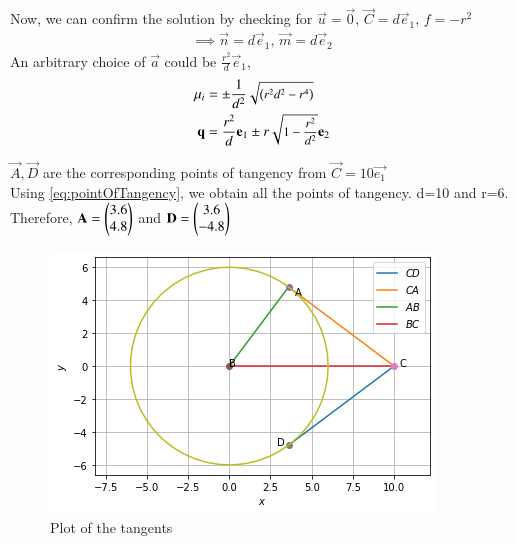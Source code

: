 \documentclass[journal,12pt,twocolumn]{IEEEtran}
\begin{document}
Now, we can confirm the solution by checking for $\vec{u}=\vec{0},\, \vec{C}=d\vec{e}_1,\, f=-r^2$
\begin{align}
  \implies \vec{n}=d\vec{e}_1,\, \vec{m}=d\vec{e}_2
\end{align}
An arbitrary choice of $\vec{a}$ could be $\frac{r^2}{d}\vec{e}_1$,
\begin{align}
  \mu_i &= \pm\frac{1}
  {
  d^2
  }
  {\small
  \sqrt{
  \left(r^2d^2-r^4\right)
  }
  }\\
  \mathbf{q}&=\frac{r^2}{d}\mathbf{e}_1 \pm r \small\sqrt{1-\frac{r^2}{d^2}}\mathbf{e}_2
  \label{eq:pointOfTangency}
\end{align}

$\vec{A}, \vec{D}$ are the corresponding points of tangency from $\vec{C}=10\vec{e_1}$ \\

Using \eqref{eq:pointOfTangency}, we obtain all the points of tangency. d=10 and r=6.\\
Therefore, $\mathbf{A} = \begin{pmatrix}3.6 \\ 4.8\end{pmatrix}$ and $\mathbf{D} = \begin{pmatrix}3.6 \\ -4.8\end{pmatrix}$ 

\begin{figure}[!ht]
    \centering
    \includegraphics{assignment3.png}
    \caption{Plot of the tangents}
    \label{plot}
\end{figure}
\end{document}
